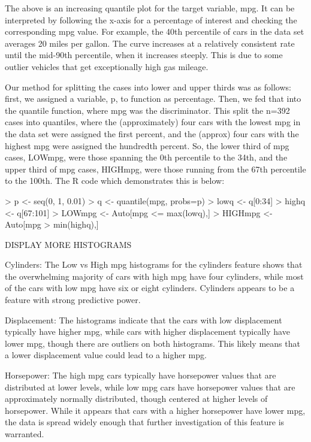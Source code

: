 \documentclass{homework}
\begin{document}
The above is an increasing quantile plot for the target variable, mpg. It can be interpreted by following the x-axis for a percentage of interest and checking the corresponding mpg value. For example, the 40th percentile of cars in the data set averages 20 miles per gallon. The curve increases at a relatively consistent rate until the mid-90th percentile, when it increases steeply. This is due to some outlier vehicles that get exceptionally high gas mileage.

\question
Our method for splitting the cases into lower and upper thirds was as follows: first, we assigned a variable, p, to function as percentage. Then, we fed that into the quantile function, where mpg was the discriminator. This split the n=392 cases into quantiles, where the (approximately) four cars with the lowest mpg in the data set were assigned the first percent, and the (approx) four cars with the highest mpg were assigned the hundredth percent. So, the lower third of mpg cases, LOWmpg, were those spanning the 0th percentile to the 34th, and the upper third of mpg cases, HIGHmpg, were those running from the 67th percentile to the 100th. The R code which demonstrates this is below:
\begin{rc}
> p <- seq(0, 1, 0.01)
> q <- quantile(mpg, probs=p)
> lowq <- q[0:34]
> highq <- q[67:101]
> LOWmpg <- Auto[mpg <= max(lowq),]
> HIGHmpg <- Auto[mpg > min(highq),]
\end{rc}

\question
DISPLAY MORE HISTOGRAMS

\question
Cylinders: The Low vs High mpg histograms for the cylinders feature shows that the overwhelming majority of cars with high mpg have four cylinders, while most of the cars with low mpg have six or eight cylinders. Cylinders appears to be a feature with strong predictive power.

Displacement: The histograms indicate that the cars with low displacement typically have higher mpg, while cars with higher displacement typically have lower mpg, though there are outliers on both histograms. This likely means that a lower displacement value could lead to a higher mpg.

Horsepower: The high mpg cars typically have horsepower values that are distributed at lower levels, while low mpg cars have horsepower values that are approximately normally distributed, though centered at higher levels of horsepower. While it appears that cars with a higher horsepower have lower mpg, the data is spread widely enough that further investigation of this feature is warranted.
\end{document}
